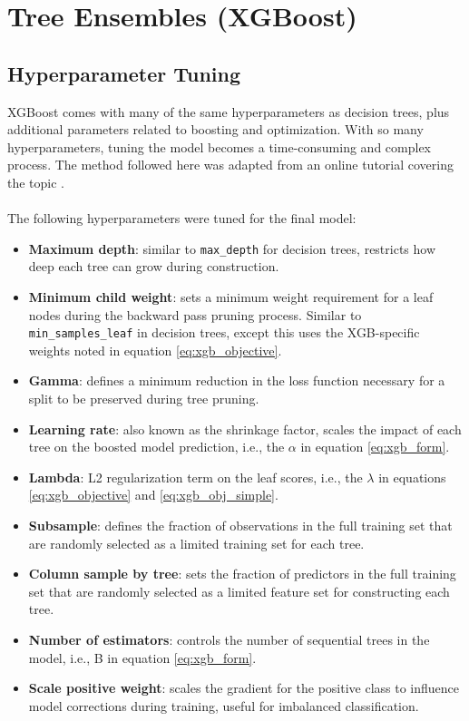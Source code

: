 \section{Tree Ensembles (XGBoost)}\label{ch5:xgb_model}
\subsection{Hyperparameter Tuning}\label{ch5:xgb_tuning}
XGBoost comes with many of the same hyperparameters as decision trees, plus additional parameters related to boosting and optimization. With so many hyperparameters, tuning the model becomes a time-consuming and complex process. The method followed here was adapted from an online tutorial covering the topic \citep{jain_xgboost_2016}.
\\
\\
The following hyperparameters were tuned for the final model:
\begin{itemize}[itemsep=2pt]
    \item \textbf{Maximum depth}: similar to \verb|max_depth| for decision trees, restricts how deep each tree can grow during construction.
    \item \textbf{Minimum child weight}: sets a minimum weight requirement for a leaf nodes during the backward pass pruning process. Similar to \verb|min_samples_leaf| in decision trees, except this uses the XGB-specific weights noted in equation \ref{eq:xgb_objective}.
    \item \textbf{Gamma}: defines a minimum reduction in the loss function necessary for a split to be preserved during tree pruning. 
    \item \textbf{Learning rate}: also known as the shrinkage factor, scales the impact of each tree on the boosted model prediction, i.e., the $\alpha$ in equation \ref{eq:xgb_form}.
    \item \textbf{Lambda}: L2 regularization term on the leaf scores, i.e., the $\lambda$ in equations \ref{eq:xgb_objective} and \ref{eq:xgb_obj_simple}.
    \item \textbf{Subsample}: defines the fraction of observations in the full training set that are randomly selected as a limited training set for each tree.
    \item \textbf{Column sample by tree}: sets the fraction of predictors in the full training set that are randomly selected as a limited feature set for constructing each tree.
    \item \textbf{Number of estimators}: controls the number of sequential trees in the model, i.e., B in equation \ref{eq:xgb_form}.
    \item \textbf{Scale positive weight}: scales the gradient for the positive class to influence model corrections during training, useful for imbalanced classification.
\end{itemize}

